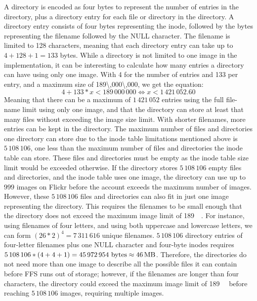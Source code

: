 A directory is encoded as four bytes to represent the number of entries in the directory, plus a directory entry for each file or directory in the directory. A directory entry consists of four bytes representing the inode, followed by the bytes representing the filename followed by the NULL character. The filename is limited to 128 characters, meaning that each directory entry can take up to $ 4 + 128 + 1 = 133$ bytes. While a directory is not limited to one image in the implementation, it can be interesting to calculate how many entries a directory can have using only one image. With \SI{4}{\byte} for the number of entries and \SI{133}{\byte} per entry, and a maximum size of \SI{189\,000\,000}{\byte}, we get the equation:
$$
	4 + 133 * x < 189\,000\,000 \Longleftrightarrow x < 1\,421\,052.60
$$
Meaning that there can be a maximum of $1\,421\,052$ entries using the full file-name limit using only one image, and that the directory can store at least that many files without exceeding the image size limit. With shorter filenames, more entries can be kept in the directory. The maximum number of files and directories one directory can store due to the inode table limitations mentioned above is $5\,108\,106$, one less than the maximum number of files and directories the inode table can store. These files and directories must be empty as the inode table size limit would be exceeded otherwise. If the directory stores $5\,108\,106$ empty files and directories, and the inode table uses one image, the directory can use up to $999$ images on Flickr before the account exceeds the maximum number of images. However, these $5\,108\,106$ files and directories can also fit in just one image representing the directory. This requires the filenames to be small enough that the directory does not exceed the maximum image limit of \SI{189}{\mega\byte}. For instance, using filenames of four letters, and using both uppercase and lowercase letters, we can form $(26*2)^4 = 7\,311\,616$ unique filenames. $5\,108\,106$ directory entries of \mbox{four-letter} filenames plus one NULL character and \mbox{four-byte} inodes requires $5\,108\,106 * (4 + 4 + 1) = 45\,972\,954\text{ bytes} \approx \text{\SI{46}{\mega\byte}}$. Therefore, the directories do not need more than one image to describe all the possible files it can contain before \gls{FFS} runs out of storage; however, if the filenames are longer than four characters, the directory could exceed the maximum image limit of \SI{189}{\mega\byte} before reaching $5\,108\,106$ images, requiring multiple images.

